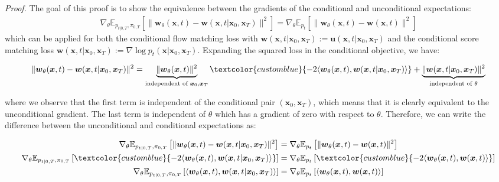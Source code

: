 \documentclass{article}
\newcommand{\bluetext}[1]{\textcolor{customblue}{#1}}
\begin{document}
\textit{Proof.} The goal of this proof is to show the equivalence between the gradients of the conditional and unconditional expectations:
\begin{align}
    \nabla_\theta\mathbb{E}_{p_{t|0,T}, \pi_{0,T}}\left[\|\boldsymbol{w}_\theta(\boldsymbol{x},t)-\boldsymbol{w}(\boldsymbol{x},t|\boldsymbol{x}_0,\boldsymbol{x}_T)\|^2\right]=\nabla_\theta\mathbb{E}_{p_t}\left[\|\boldsymbol{w}_\theta(\boldsymbol{x},t)-\boldsymbol{w}(\boldsymbol{x},t)\|^2\right]
\end{align}
which can be applied for both the conditional flow matching loss with $\boldsymbol{w}(\boldsymbol{x},t|\boldsymbol{x}_0,\boldsymbol{x}_T):= \boldsymbol{u}(\boldsymbol{x},t|\boldsymbol{x}_0,\boldsymbol{x}_T)$ and the conditional score matching loss $\boldsymbol{w}(\boldsymbol{x},t|\boldsymbol{x}_0,\boldsymbol{x}_T):= \nabla \log p_t(\boldsymbol{x}|\boldsymbol{x}_0,\boldsymbol{x}_T)$. Expanding the squared loss in the conditional objective, we have:
\begin{small}
\begin{align}
    \|\boldsymbol{w}_\theta(\boldsymbol{x},t)-\boldsymbol{w}(\boldsymbol{x},t|\boldsymbol{x}_0,\boldsymbol{x}_T)\|^2=\underbrace{\|\boldsymbol{w}_\theta(\boldsymbol{x},t)\|^2}_{\text{independent of }\boldsymbol{x}_0,\boldsymbol{x}_T}\bluetext{-2\langle \boldsymbol{w}_\theta(\boldsymbol{x},t), \boldsymbol{w}(\boldsymbol{x},t|\boldsymbol{x}_0,\boldsymbol{x}_T)\rangle}+\underbrace{\|\boldsymbol{w}(\boldsymbol{x},t|\boldsymbol{x}_0,\boldsymbol{x}_T)\|^2}_{\text{independent of }\theta}
\end{align}
\end{small}
where we observe that the first term is independent of the conditional pair $(\boldsymbol{x}_0,\boldsymbol{x}_T)$, which means that it is clearly equivalent to the unconditional gradient. The last term is independent of $\theta$ which has a gradient of zero with respect to $\theta$. Therefore, we can write the difference between the unconditional and conditional expectations as:
\begin{small}
\begin{align}
    \nabla_\theta\mathbb{E}_{p_{t|0,T},  \pi_{0,T}}\left[\|\boldsymbol{w}_\theta(\boldsymbol{x},t)-\boldsymbol{w}(\boldsymbol{x},t|\boldsymbol{x}_0,\boldsymbol{x}_T)\|^2\right]&=\nabla_\theta\mathbb{E}_{ p_t}\left[\|\boldsymbol{w}_\theta(\boldsymbol{x},t)-\boldsymbol{w}(\boldsymbol{x},t)\|^2\right]\nonumber\\
    \nabla_\theta\mathbb{E}_{p_{t|0,T},  \pi_{0,T}}\left[\bluetext{-2\langle \boldsymbol{w}_\theta(\boldsymbol{x},t), \boldsymbol{w}(\boldsymbol{x},t|\boldsymbol{x}_0,\boldsymbol{x}_T)\rangle}\right]&=\nabla_\theta\mathbb{E}_{p_t}\left[\bluetext{-2\langle \boldsymbol{w}_\theta(\boldsymbol{x},t),\boldsymbol{w}(\boldsymbol{x},t)\rangle} \right]\nonumber\\
    \nabla_\theta\mathbb{E}_{p_{t|0,T},  \pi_{0,T}}\left[\langle \boldsymbol{w}_\theta(\boldsymbol{x},t), \boldsymbol{w}(\boldsymbol{x},t|\boldsymbol{x}_0,\boldsymbol{x}_T)\rangle\right]&=\nabla_\theta\mathbb{E}_{p_t}\left[\langle \boldsymbol{w}_\theta(\boldsymbol{x},t),\boldsymbol{w}(\boldsymbol{x},t)\rangle \right]
\end{align}
\end{small}
\end{document}
